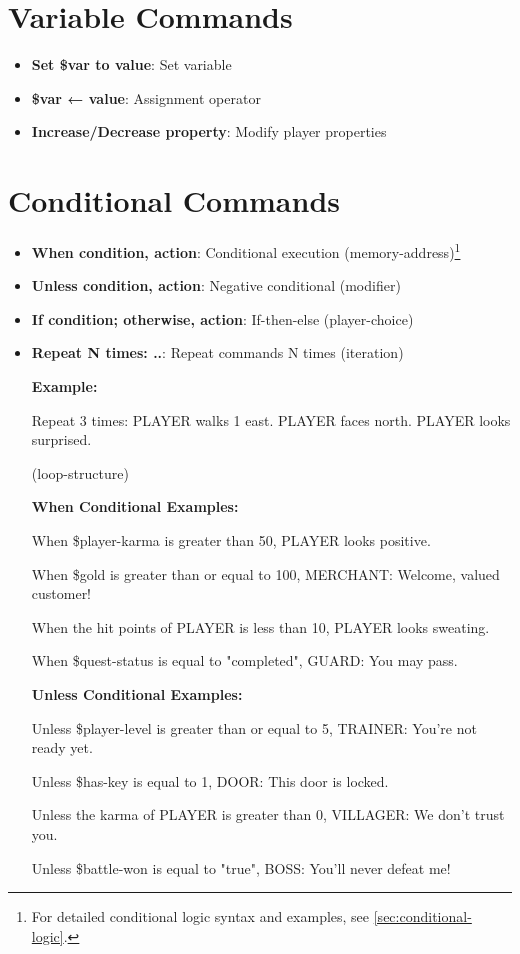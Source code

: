 \documentclass[11pt,letterpaper,oldstylefigures]{memoir}
\newcommand{\stagedir}[1]{#1\par\vspace{1\baselineskip}}
\newenvironment{FountainExample}
  {\begingroup
  \ttfamily\small
   \setlength{\parindent}{0pt}
  \setlength{\parskip}{0.5em}
  \allowdisplaybreaks
  \setlength{\displaywidowpenalty}{0}
  \setlength{\widowpenalty}{0}
  \setlength{\clubpenalty}{0}
  \setlength{\interlinepenalty}{0}
}
  {\endgroup}
\newcommand{\fountain}[1]{\textbf{#1}}
\begin{document}
\section{Variable Commands}
\begin{itemize}
\item \fountain{Set \$var to value}: Set variable
\item \fountain{\$var ← value}: Assignment operator
\item \fountain{Increase/Decrease property}: Modify player properties
\end{itemize}

\section{Conditional Commands}
\begin{itemize}
\item \fountain{When condition, action}: Conditional execution (\gls{memory-address})\footnote{For detailed conditional logic syntax and examples, see \autoref{sec:conditional-logic}.}
\item \fountain{Unless condition, action}: Negative conditional (\gls{modifier})
\item \fountain{If condition; otherwise, action}: If-then-else (\gls{player-choice})
\item \fountain{Repeat N times: ..}: Repeat commands N times (\gls{iteration})

\textbf{Example:}
\begin{FountainExample}
\stagedir{Repeat 3 times: PLAYER walks 1 east. PLAYER faces north. PLAYER looks surprised.} (\gls{loop-structure})
\end{FountainExample}

\textbf{When Conditional Examples:}
\begin{FountainExample}
\stagedir{When \$player-karma is greater than 50, PLAYER looks positive.}
\stagedir{When \$gold is greater than or equal to 100, MERCHANT: Welcome, valued customer!}
\stagedir{When the hit points of PLAYER is less than 10, PLAYER looks sweating.}
\stagedir{When \$quest-status is equal to "completed", GUARD: You may pass.}
\end{FountainExample}

\textbf{Unless Conditional Examples:}
\begin{FountainExample}
\stagedir{Unless \$player-level is greater than or equal to 5, TRAINER: You're not ready yet.}
\stagedir{Unless \$has-key is equal to 1, DOOR: This door is locked.}
\stagedir{Unless the karma of PLAYER is greater than 0, VILLAGER: We don't trust you.}
\stagedir{Unless \$battle-won is equal to "true", BOSS: You'll never defeat me!}
\end{FountainExample}


\end{itemize}
\end{document}
